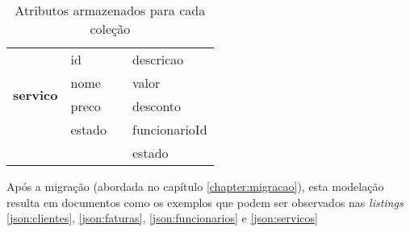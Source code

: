 \begin{table}[h]
\begin{tabular}{cl|c|l|}
\multicolumn{1}{|c|}{\multirow{4}{*}{\textbf{servico}}}  & id                 &                                       & descricao            \\
\multicolumn{1}{|c|}{}                                   & nome               &                                       & valor                \\
\multicolumn{1}{|c|}{}                                   & preco              &                                       & desconto             \\
\multicolumn{1}{|c|}{}                                   & estado             &                                       & funcionarioId        \\ \cline{1-2}
\multicolumn{1}{l}{}                                     &                    &                                       & estado               \\ \cline{3-4} 
\end{tabular}
\caption{Atributos armazenados para cada coleção}
\label{tab:noSQLatributos}
\end{table}

Após a migração (abordada no capítulo \ref{chapter:migracao}), esta modelação resulta em documentos como os exemplos que podem ser observados nas \emph{listings} \ref{json:clientes}, \ref{json:faturas}, \ref{json:funcionarios} e \ref{json:servicos}

